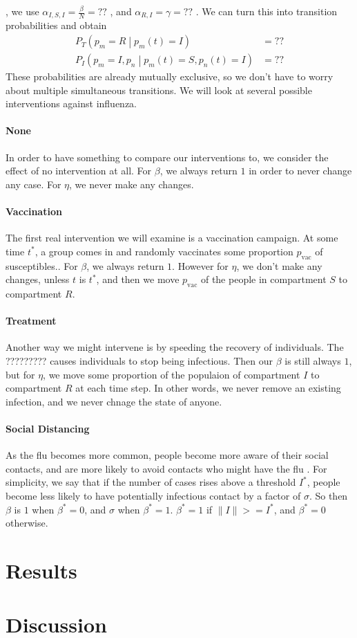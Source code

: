 \documentclass{article}
\begin{document}
, we use $\alpha_{I,S,I} = \frac{\beta}{N} = ??$ %
, and $\alpha_{R,I} = \gamma = ??$ %
.  We can turn this into transition probabilities and obtain
\begin{align*}
   P_T\left(p_m = R \middle| p_m(t) = I\right) &= ?? %
\\ P_I\left(p_m = I ,p_n \middle| p_m(t) = S, p_n(t) = I \right) &= ??%
\end{align*}
These probabilities are already mutually exclusive, so we don't have to worry about multiple simultaneous transitions.  We will look at several possible interventions against influenza.

\paragraph{None}
In order to have something to compare our interventions to, we consider the effect of no intervention at all.  For $\beta$, we always return $1$ in order to never change any case.  For $\eta$, we never make any changes.
\paragraph{Vaccination}
The first real intervention we will examine is a vaccination campaign.  At some time $t^*$, a group comes in and randomly vaccinates some proportion $p_{\text{vac}}$ of susceptibles..  For $\beta$, we always return $1$.  However for $\eta$, we don't make any changes, unless $t$ is $t^*$, and then we move $p_{\text{vac}}$ of the people in compartment $S$ to compartment $R$.
\paragraph{Treatment}
Another way we might intervene is by speeding the recovery of individuals.  The ????????? %
causes individuals to stop being infectious.  Then our $\beta$ is still always $1$, but for $\eta$, we move some proportion of the populaion of compartment $I$ to compartment $R$ at each time step.
In other words, we never remove an existing infection, and we never chnage the state of anyone.
\paragraph{Social Distancing}
As the flu becomes more common, people become more aware of their social contacts, and are more likely to avoid contacts who might have the flu \cite{}.  For simplicity, we say that if the number of cases rises above a threshold $I^*$, people become less likely to have potentially infectious contact by a factor of $\sigma$.  So then $\beta$ is $1$ when $\beta^* = 0$, and $\sigma$ when $\beta^* = 1$.  $\beta^* = 1$ if $\| I \| >= I^*$, and $\beta^* = 0$ otherwise.
\section{Results}
\section{Discussion}

{}

\end{document}
